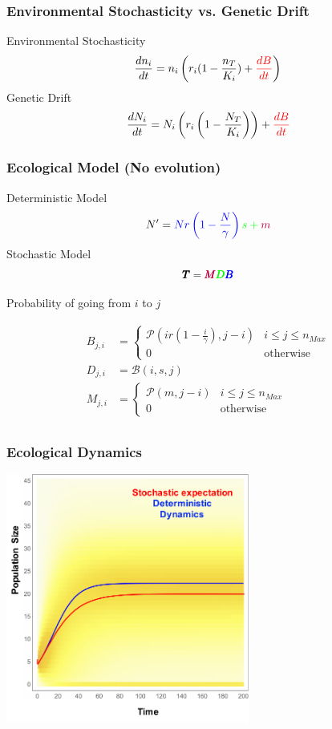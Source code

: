 \documentclass{beamer}
\begin{document}
\begin{frame}
\frametitle{Environmental Stochasticity vs. Genetic Drift}
Environmental Stochasticity
\begin{equation*}
\frac{dn_i}{dt}=n_i\left(r_i(1-\frac{n_T}{K_i})+\begingroup\color{red}\frac{dB}{dt}\endgroup\right)
\end{equation*}
Genetic Drift
\begin{equation*}
\frac{dN_i}{dt}=N_i\left(r_i\left(1-\frac{N_T}{K_i}\right)\right)+\begingroup\color{red}\frac{dB}{dt}\endgroup
\end{equation*}
\end{frame}
\begin{frame}
\frametitle{Ecological Model (No evolution)}
Deterministic Model
\begin{equation*}
N'=\begingroup\color{blue}N r\left(1-\frac{N}{\gamma}\right)\endgroup \color{green}s+\color{purple}m
\end{equation*}
Stochastic Model
\begin{equation*}
\pmb{T}=\color{purple}\pmb{M}\color{green}\pmb{D}\color{blue}\pmb{B}
\end{equation*}
\tiny
\begin{center}
Probability of going from \(i\) to \(j\)
\end{center}
\begin{equation*}
\begin{aligned}
B_{j,i}&=\begin{cases}
\mathcal{P}\left(i r(1-\frac{i}{\gamma}),j-i\right)& i\leq j\leq n_{Max}\\
0 & \text{otherwise}
\end{cases}\\
D_{j,i}&=\mathcal{B}\left(i,s,j\right)\\
M_{j,i}&=\begin{cases}
\mathcal{P}\left(m,j-i\right)& i\leq j\leq n_{Max}\\
0 & \text{otherwise}
\end{cases}\\
\end{aligned}
\end{equation*}
\normalsize
\end{frame}
\begin{frame}
\frametitle{Ecological Dynamics}
\begin{center}
\includegraphics[width=0.6\textwidth]{ecoModel.pdf}
\end{center}
\end{frame}
\end{document}
